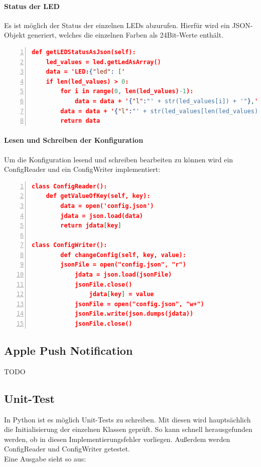 \paragraph{Status der LED} Es ist möglich der Status der einzelnen LEDs abzurufen. Hierfür wird ein JSON-Objekt generiert, welches die einzelnen Farben als 24Bit-Werte enthält.
\begin{lstlisting}[caption=Status der LEDs an Client senden, language=json, frame=single, breaklines=true,columns=fullflexible, commentstyle=\color{gray}\upshape, captionpos=b, numbers = left]
  def getLEDStatusAsJson(self):
    led_values = led.getLedAsArray()
    data = 'LED:{"led": ['
    if len(led_values) > 0:
        for i in range(0, len(led_values)-1):
            data = data + '{"l":"' + str(led_values[i]) + '"},'
        data = data + '{"l":"' + str(led_values[len(led_values)-1]) + '"}]}'
        return data
\end{lstlisting}

\paragraph{Lesen und Schreiben der Konfiguration}  Um die Konfiguration lesend und schreiben bearbeiten zu können wird ein ConfigReader und ein ConfigWriter implementiert:
\begin{lstlisting}[caption=ConfigReader / ConfigWriter, language=json, frame=single, breaklines=true,columns=fullflexible, commentstyle=\color{gray}\upshape, captionpos=b, numbers = left]
class ConfigReader():
	def getValueOfKey(self, key):
		data = open('config.json')
		jdata = json.load(data)
		return jdata[key]

class ConfigWriter():
    	def changeConfig(self, key, value):
		jsonFile = open("config.json", "r")
      	  	jdata = json.load(jsonFile)
      	  	jsonFile.close()
    	    	jdata[key] = value
   	    	jsonFile = open("config.json", "w+")
	     	jsonFile.write(json.dumps(jdata))
       		jsonFile.close()
\end{lstlisting}

\subsection{Apple Push Notification} TODO

\subsection{Unit-Test}
In Python ist es möglich Unit-Tests zu schreiben. Mit diesen wird hauptsächlich die Initialisierung der einzelnen Klassen geprüft. So kann schnell herausgefunden werden, ob in diesen Implementierungsfehler vorliegen. Außerdem werden ConfigReader und ConfigWriter getestet. \\
Eine Ausgabe sieht so aus:

